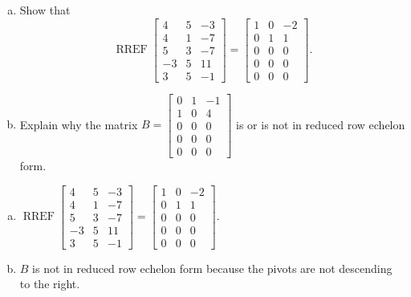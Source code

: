 
\begin{exerciseStatement}

\begin{enumerate}[(a)]
\item Show that \[\operatorname{RREF} \left[\begin{array}{ccc}
4 & 5 & -3 \\
4 & 1 & -7 \\
5 & 3 & -7 \\
-3 & 5 & 11 \\
3 & 5 & -1
\end{array}\right] = \left[\begin{array}{ccc}
1 & 0 & -2 \\
0 & 1 & 1 \\
0 & 0 & 0 \\
0 & 0 & 0 \\
0 & 0 & 0
\end{array}\right] .\]
\item Explain why the matrix \(B= \left[\begin{array}{ccc}
0 & 1 & -1 \\
1 & 0 & 4 \\
0 & 0 & 0 \\
0 & 0 & 0 \\
0 & 0 & 0
\end{array}\right] \) is or is not in reduced row echelon form.
\end{enumerate}
    
\end{exerciseStatement}
    
\begin{exerciseAnswer} 

\begin{enumerate}[(a)]
\item \(\operatorname{RREF} \left[\begin{array}{ccc}
4 & 5 & -3 \\
4 & 1 & -7 \\
5 & 3 & -7 \\
-3 & 5 & 11 \\
3 & 5 & -1
\end{array}\right] = \left[\begin{array}{ccc}
1 & 0 & -2 \\
0 & 1 & 1 \\
0 & 0 & 0 \\
0 & 0 & 0 \\
0 & 0 & 0
\end{array}\right] .\)
\item \(B\) is not in reduced row echelon form because the pivots are not descending to the right. 
\end{enumerate}
    
\end{exerciseAnswer}
    
